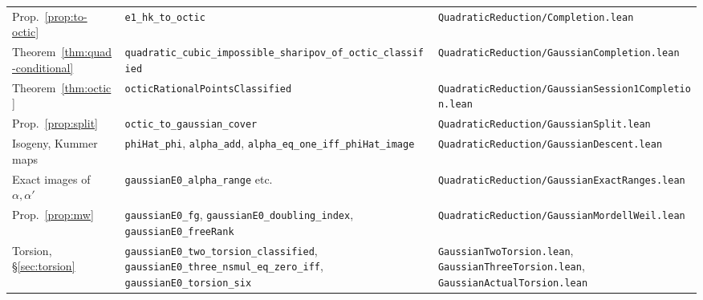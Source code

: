 \documentclass[10pt]{article}
\theoremstyle{definition}
\theoremstyle{remark}
\begin{document}
\begin{small}
\begin{longtable}{@{}p{3.6cm}p{6.3cm}p{5.4cm}@{}}
Prop.~\ref{prop:to-octic} & \texttt{e1\_\allowbreak hk\_\allowbreak to\_\allowbreak octic} & \texttt{Quadratic\allowbreak Reduction/\allowbreak Completion.\allowbreak lean}\\
Theorem~\ref{thm:quad-conditional} & \texttt{quadratic\_\allowbreak cubic\_\allowbreak impossible\_\allowbreak sharipov\_\allowbreak of\_\allowbreak octic\_\allowbreak classified} & \texttt{Quadratic\allowbreak Reduction/\allowbreak Gaussian\allowbreak Completion.\allowbreak lean}\\
\midrule
Theorem~\ref{thm:octic} & \texttt{octic\allowbreak Rational\allowbreak Points\allowbreak Classified} & \texttt{Quadratic\allowbreak Reduction/\allowbreak Gaussian\allowbreak Session1\allowbreak Completion.\allowbreak lean}\\
Prop.~\ref{prop:split} & \texttt{octic\_\allowbreak to\_\allowbreak gaussian\_\allowbreak cover} & \texttt{Quadratic\allowbreak Reduction/\allowbreak Gaussian\allowbreak Split.\allowbreak lean}\\
Isogeny, Kummer maps & \texttt{phi\allowbreak Hat\_\allowbreak phi}, \texttt{alpha\_\allowbreak add}, \texttt{alpha\_\allowbreak eq\_\allowbreak one\_\allowbreak iff\_\allowbreak phi\allowbreak Hat\_\allowbreak image} & \texttt{Quadratic\allowbreak Reduction/\allowbreak Gaussian\allowbreak Descent.\allowbreak lean}\\
Exact images of $\alpha,\alpha'$ & \texttt{gaussian\allowbreak E0\_\allowbreak alpha\_\allowbreak range} etc. & \texttt{Quadratic\allowbreak Reduction/\allowbreak Gaussian\allowbreak Exact\allowbreak Ranges.\allowbreak lean}\\
Prop.~\ref{prop:mw} & \texttt{gaussian\allowbreak E0\_\allowbreak fg}, \texttt{gaussian\allowbreak E0\_\allowbreak doubling\_\allowbreak index}, \texttt{gaussian\allowbreak E0\_\allowbreak free\allowbreak Rank} & \texttt{Quadratic\allowbreak Reduction/\allowbreak Gaussian\allowbreak Mordell\allowbreak Weil.\allowbreak lean}\\
Torsion, \S\ref{sec:torsion} & \texttt{gaussian\allowbreak E0\_\allowbreak two\_\allowbreak torsion\_\allowbreak classified}, \texttt{gaussian\allowbreak E0\_\allowbreak three\_\allowbreak nsmul\_\allowbreak eq\_\allowbreak zero\_\allowbreak iff}, \texttt{gaussian\allowbreak E0\_\allowbreak torsion\_\allowbreak six} & \texttt{Gaussian\allowbreak Two\allowbreak Torsion.\allowbreak lean}, \texttt{Gaussian\allowbreak Three\allowbreak Torsion.\allowbreak lean}, \texttt{Gaussian\allowbreak Actual\allowbreak Torsion.\allowbreak lean}\\

\end{longtable}
\end{small}
\end{document}
